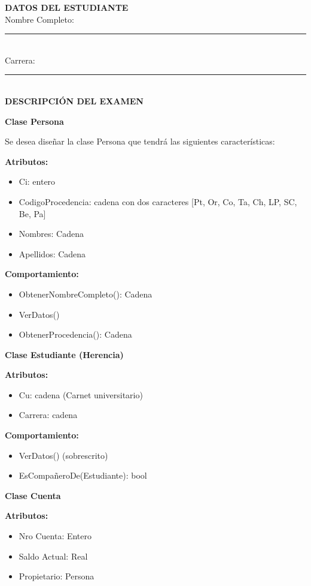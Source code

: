 \documentclass[8pt]{article}
\begin{document}
\begin{multicols}{2}
\columnbreak

\textbf{DATOS DEL ESTUDIANTE}\\
Nombre Completo: \rule{4cm}{0.5pt}\\
Carrera: \rule{4cm}{0.5pt}\\[2pt]

\textbf{DESCRIPCIÓN DEL EXAMEN}

\textbf{Clase Persona}

Se desea diseñar la clase Persona que tendrá las siguientes características:

\textbf{Atributos:}
\begin{itemize}[leftmargin=10pt, itemsep=0pt]
    \item Ci: entero
    \item CodigoProcedencia: cadena con dos caracteres [Pt, Or, Co, Ta, Ch, LP, SC, Be, Pa]
    \item Nombres: Cadena
    \item Apellidos: Cadena
\end{itemize}

\textbf{Comportamiento:}
\begin{itemize}[leftmargin=10pt, itemsep=0pt]
    \item ObtenerNombreCompleto(): Cadena
    \item VerDatos()
    \item ObtenerProcedencia(): Cadena
\end{itemize}

\textbf{Clase Estudiante (Herencia)}

\textbf{Atributos:}
\begin{itemize}[leftmargin=10pt, itemsep=0pt]
    \item Cu: cadena (Carnet universitario)
    \item Carrera: cadena
\end{itemize}

\textbf{Comportamiento:}
\begin{itemize}[leftmargin=10pt, itemsep=0pt]
    \item VerDatos() (sobrescrito)
    \item EsCompañeroDe(Estudiante): bool
\end{itemize}

\textbf{Clase Cuenta}

\textbf{Atributos:}
\begin{itemize}[leftmargin=10pt, itemsep=0pt]
    \item Nro Cuenta: Entero
    \item Saldo Actual: Real
    \item Propietario: Persona
\end{itemize}


\end{multicols}
\end{document}

